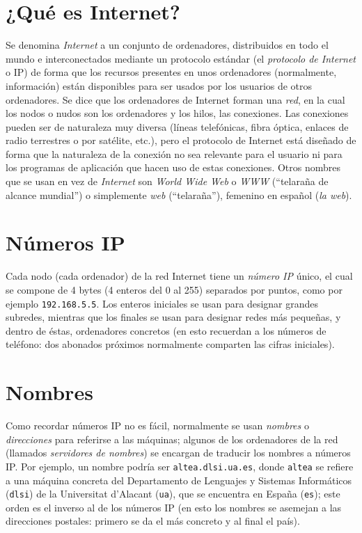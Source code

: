 \section{¿Qué es Internet?} 

Se denomina \emph{Internet} a un conjunto de ordenadores, distribuidos en todo el mundo e interconectados mediante un protocolo estándar (el \emph{protocolo de Internet} o IP) de forma que los recursos presentes en unos ordenadores (normalmente, información) están disponibles para ser usados por los usuarios de otros ordenadores. Se dice que los ordenadores de Internet forman una \emph{red}, en la cual los nodos o nudos son los ordenadores y los hilos, las conexiones. Las conexiones pueden ser de naturaleza muy diversa (líneas telefónicas, fibra óptica, enlaces de radio terrestres o por satélite, etc.), pero el protocolo de Internet está diseñado de forma que la naturaleza de la conexión no sea relevante para el usuario ni para los programas de aplicación que hacen uso de estas conexiones. Otros nombres que se usan en vez de \emph{Internet} son \emph{World Wide Web} o \emph{WWW} (``telaraña de alcance mundial'') o simplemente \emph{web} (``telaraña''), femenino en español (\emph{la web}). 

\section{Números IP} Cada nodo (cada ordenador) de la red Internet tiene un {\em número IP} único, el cual se compone de 4 bytes (4 enteros del 0 al 255) separados por puntos, como por ejemplo {\tt 192.168.5.5}. Los enteros iniciales se usan para designar grandes subredes, mientras que los finales se usan para designar redes más pequeñas, y dentro de éstas, ordenadores concretos (en esto recuerdan a los números de teléfono: dos abonados próximos normalmente comparten las cifras iniciales). 

\section{Nombres} Como recordar números IP no es fácil, normalmente se usan \emph{nombres} o \emph{direcciones} para referirse a las máquinas; algunos de los ordenadores de la red (llamados \emph{servidores de nombres}) se encargan de traducir los nombres a números IP. Por ejemplo, un nombre podría ser \texttt{altea.dlsi.ua.es}, donde \texttt{altea} se refiere a una máquina concreta del Departamento de Lenguajes y Sistemas Informáticos (\texttt{dlsi}) de la Universitat d'Alacant (\texttt{ua}), que se encuentra en España (\texttt{es}); este orden es el inverso al de los números IP (en esto los nombres se asemejan a las direcciones postales: primero se da el más concreto y al final el país). 

